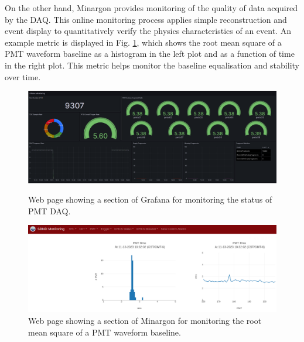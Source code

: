On the other hand, Minargon provides monitoring of the quality of data acquired by the DAQ. 
This online monitoring process applies simple reconstruction and event display to quantitatively verify the physics characteristics of an event. 
An example metric is displayed in Fig. \ref{fig:Minargon}, which shows the root mean square of a PMT waveform baseline as a histogram in the left plot and as a function of time in the right plot.
This metric helps monitor the baseline equalisation and stability over time.

\begin{figure}[ht!] 
\centering    
\includegraphics[width=1.0\textwidth]{Grafana}
\caption[Grafana Online Monitoring Web Page]{
Web page showing a section of Grafana for monitoring the status of PMT DAQ.
}
\label{fig:Grafana}
\vspace{0.5cm}
\centering    
\includegraphics[width=1.0\textwidth]{Minargon}
\caption[Minargon Online Monitoring Web Page]{
Web page showing a section of Minargon for monitoring the root mean square of a PMT waveform baseline.
}
\label{fig:Minargon}
\end{figure}


